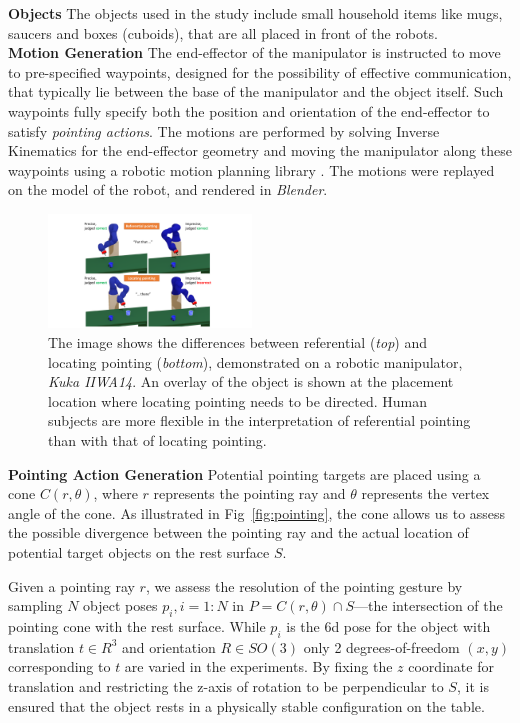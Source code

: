 \documentclass[letterpaper]{article} %
\begin{document}
\noindent\textbf{Objects}  The objects used in the study include small household items like mugs, saucers and boxes (cuboids), that are all placed in front of the robots.\\

\noindent\textbf{Motion Generation}  The end-effector of the manipulator is instructed to move to pre-specified waypoints, designed for the possibility of effective communication, that typically lie between the base of the manipulator and the object itself. Such waypoints fully specify both the position and orientation of the end-effector to satisfy \textit{pointing actions}. The motions are performed by solving Inverse Kinematics for the end-effector geometry and moving the manipulator along these waypoints using a robotic motion planning library \cite{pracsys2014}. The motions were replayed on the model of the robot, and rendered in \textit{Blender}.\\


\begin{figure}[t]
    \centering
    \includegraphics[width=0.48\textwidth]{spatial-referential.pdf}
    \caption{The image shows the differences between referential (\textit{top}) and locating pointing (\textit{bottom}), demonstrated on a robotic manipulator, \textit{Kuka IIWA14}. An overlay of the object is shown at the placement location where locating pointing needs to be directed.  Human subjects are more flexible in the interpretation of  referential pointing than with that of locating pointing.}
    \label{fig:spatial}
\end{figure}

\noindent\textbf{Pointing Action Generation} Potential pointing targets are placed using a cone $C(r, \theta)$, where $r$ represents the pointing ray and $\theta$ represents the vertex angle of the cone. As illustrated in Fig~\ref{fig:pointing}, the cone allows us to assess the possible divergence between the pointing ray and the actual location of potential target objects on the rest surface $S$. 

Given a pointing ray $r$, we assess the resolution of the pointing gesture by sampling $N$ object poses $p_i, i=1:N$ in $P=C(r, \theta) \cap S$---the intersection of the pointing cone with the rest surface.  While $p_i$ is the 6d pose for the object with translation $t \in R^3$ and orientation $R \in SO(3)$ only 2  degrees-of-freedom $(x, y)$ corresponding to $t$ are varied in the experiments. By fixing the $z$ coordinate for translation and restricting the z-axis of rotation to be perpendicular to $S$, it is ensured that the object rests in a physically stable configuration on the table.
\end{document}
